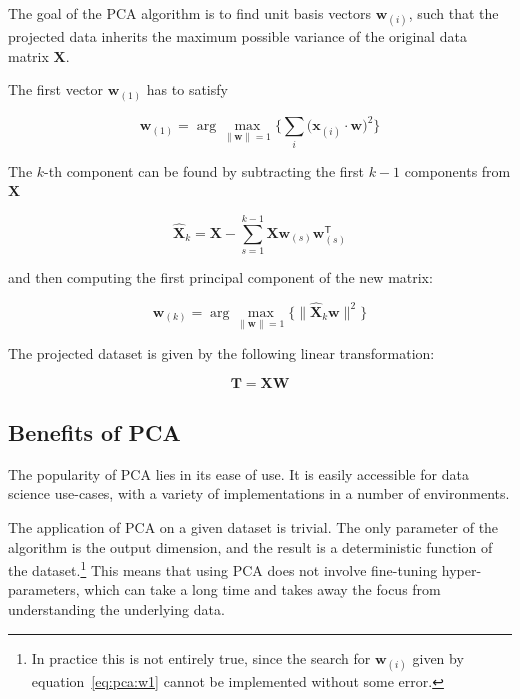 The goal of the PCA algorithm is to find unit basis vectors $\mathbf{w}_{(i)}$, such that the projected data inherits the maximum possible variance of the original data matrix $\mathbf{X}$.

The first vector $\mathbf{w}_{(1)}$ has to satisfy

\begin{equation}
	\mathbf{w}_{(1)} = \arg\max_{\lVert \mathbf{w} \rVert = 1}{ \Bigg\{ \sum_i{ \big(\mathbf{x}_{(i)} \cdot \mathbf{w} \big)^2 } \Bigg\} }
	\label{eq:pca:w1}
\end{equation}

The $k$-th component can be found by subtracting the first $k - 1$ components from $\mathbf{X}$

\begin{equation}
	\mathbf{\hat{X}}_{k}=\mathbf{X}-\sum_{s=1}^{k-1}\mathbf{X}\mathbf{w}_{(s)}\mathbf{w}_{(s)}^{\mathsf{T}}
	\label{eq:pca_xhat}
\end{equation}

and then computing the first principal component of the new matrix:

\begin{equation}
	\mathbf{w}_{(k)}=\arg\max_{\lVert \mathbf{w} \rVert = 1}{\Bigg\{ \lVert \mathbf{\hat {X}}_{k}\mathbf{w} \rVert ^2 \Bigg\} }
	\label{eq:pca:wk}
\end{equation}

The projected dataset is given by the following linear transformation:

\begin{equation}
	\mathbf{T} = \mathbf{XW}
	\label{eq:pca:t}
\end{equation}

\subsection{Benefits of PCA}\label{subsec:benefits-of-pca}

The popularity of PCA lies in its ease of use. It is easily accessible for data science use-cases, with a variety of implementations in a number of environments.

The application of PCA on a given dataset is trivial. The only parameter of the algorithm is the output dimension, and the result is a deterministic function of the dataset.\footnote{In practice this is not entirely true, since the search for $\mathbf{w}_{(i)}$ given by equation~\eqref{eq:pca:w1} cannot be implemented without some error.} This means that using PCA does not involve fine-tuning hyper-parameters, which can take a long time and takes away the focus from understanding the underlying data.

